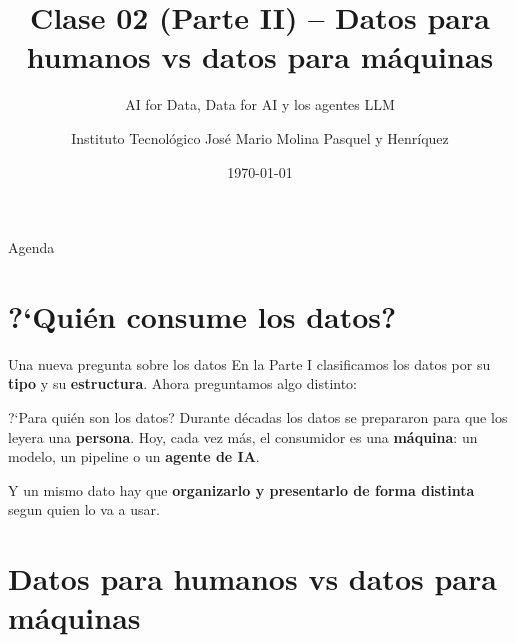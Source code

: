 \documentclass[aspectratio=169]{beamer}
\title{Clase 02 (Parte II) -- Datos para humanos vs datos para m\'aquinas}
\subtitle{AI for Data, Data for AI y los agentes LLM}
\author{Instituto Tecnol\'ogico Jos\'e Mario Molina Pasquel y Henr\'iquez}
\date{\today}
\begin{document}
\begin{frame}[plain]
  \titlepage
\end{frame}

\begin{frame}{Agenda}
  \tableofcontents
\end{frame}

\section{?`Qui\'en consume los datos?}

\begin{frame}{Una nueva pregunta sobre los datos}
  En la Parte I clasificamos los datos por su \textbf{tipo} y su \textbf{estructura}.
  Ahora preguntamos algo distinto:
  \begin{block}{?`Para qui\'en son los datos?}
    Durante d\'ecadas los datos se prepararon para que los leyera una
    \textbf{persona}. Hoy, cada vez m\'as, el consumidor es una \textbf{m\'aquina}:
    un modelo, un pipeline o un \textbf{agente de IA}.
  \end{block}
  \vspace{0.3em}
  Y un mismo dato hay que \textbf{organizarlo y presentarlo de forma distinta}
  segun quien lo va a usar.
\end{frame}

\section{Datos para humanos vs datos para m\'aquinas}
\end{document}
